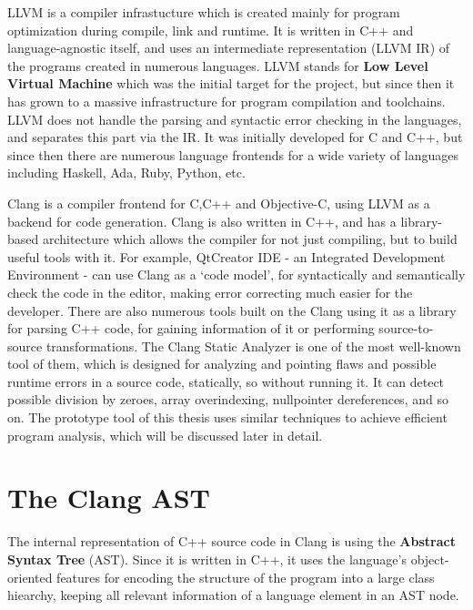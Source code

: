\documentclass[oneside,12pt,a4paper]{book}
\begin{document}
LLVM is a compiler infrastucture which is created mainly for program optimization during compile, link and runtime. It is written in C++ and language-agnostic itself, and uses an intermediate representation (LLVM IR) of the programs created in numerous languages. LLVM stands for \textbf{Low Level Virtual Machine} which was the initial target for the project, but since then it has grown to a massive infrastructure for program compilation and toolchains. LLVM does not handle the parsing and syntactic error checking in the languages, and separates this part via the IR. It was initially developed for C and C++, but since then there are numerous language frontends for a wide variety of languages including Haskell, Ada, Ruby, Python, etc. 

Clang is a compiler frontend for C,C++ and Objective-C, using LLVM as a backend for code generation. Clang is also written in C++, and has a library-based architecture which allows the compiler for not just compiling, but to build useful tools with it. For example, QtCreator IDE - an Integrated Development Environment - can use Clang as a `code model', for syntactically and semantically check the code in the editor, making error correcting much easier for the developer. There are also numerous tools built on the Clang using it as a library for parsing C++ code, for gaining information of it or performing source-to-source transformations. The Clang Static Analyzer is one of the most well-known tool of them, which is designed for analyzing and pointing flaws and possible runtime errors in a source code, statically, so without running it. It can detect possible division by zeroes, array overindexing, nullpointer dereferences, and so on. The prototype tool of this thesis uses similar techniques to achieve efficient program analysis, which will be discussed later in detail.

\section{The Clang AST}

The internal representation of C++ source code in Clang is using the \textbf{Abstract Syntax Tree} (AST\cite{Clang-AST}). Since it is written in C++, it uses the language's object-oriented features for encoding the structure of the program into a large class hiearchy, keeping all relevant information of a language element in an AST node.
\end{document}
